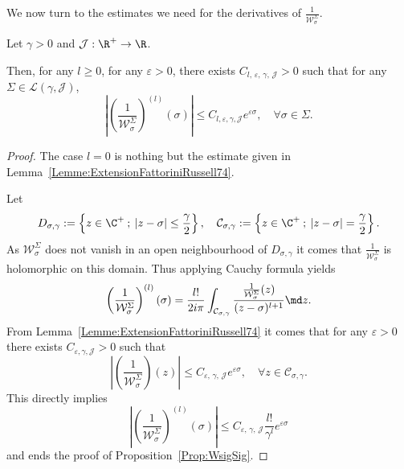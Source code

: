 We now turn to the estimates we need for the derivatives of $\frac{1}{\mathcal{W}^{\Sigma}_{\sigma}}$.

\begin{prop}\label{Prop:WsigSig}
Let $\gamma >0$ and $\mathcal{J} : \R^+ \to \R$.

Then, for any $l \geq 0$, for any $\varepsilon >0$, there exists $C_{l,\,\varepsilon,\,\gamma,\,\mathcal{J}}>0$ such that for any $\Sigma \in \mathcal{L}(\gamma, \mathcal{J})$,
\[
\left| \left(\frac{1}{\mathcal{W}^\Sigma_{\sigma}} \right)^{(l)} (\sigma) \right| \leq C_{l,\varepsilon, \gamma, \mathcal{J}} e^{\varepsilon \sigma}, \quad \forall \sigma \in \Sigma.
\]
\end{prop}

\begin{proof}
The case $l=0$ is nothing but the estimate given in Lemma~\ref{Lemme:ExtensionFattoriniRussell74}.

Let
\[
D_{\sigma,\gamma} := \left\{ z \in \C^+ \: ; \: |z-\sigma| \leq \frac{\gamma}{2} \right\},
\quad
\mathcal{C}_{\sigma,\gamma} := \left\{ z \in \C^+ \: ; \: |z-\sigma| = \frac{\gamma}{2} \right\}.
\]
As $\mathcal{W}^{\Sigma}_\sigma$ does not vanish in an open neighbourhood of $D_{\sigma, \gamma}$ it comes that $\frac{1}{\mathcal{W}^{\Sigma}_\sigma}$ is holomorphic on this domain. Thus applying Cauchy formula yields
\[
\left(\frac{1}{\mathcal{W}^\Sigma_\sigma} \right)^{(l)} (\sigma) = \frac{l!}{2i\pi} \int_{\mathcal{C}_{\sigma,\gamma}} \frac{\frac{1}{\mathcal{W}^\Sigma_\sigma}(z)}{(z-\sigma)^{l+1}} \md z.
\]
From Lemma~\ref{Lemme:ExtensionFattoriniRussell74} it comes that for any $\varepsilon>0$ there exists $C_{\varepsilon, \gamma, \mathcal{J}}>0$ such that
\[
\left| \left(\frac{1}{\mathcal{W}^\Sigma_\sigma} \right)(z) \right| \leq C_{\varepsilon,\,\gamma,\,\mathcal{J}} e^{\varepsilon \sigma}, \quad\forall z\in \mathcal{C}_{\sigma,\gamma}.
\]
This directly implies
\[
\left| \left(\frac{1}{\mathcal{W}^\Sigma_\sigma} \right)^{(l)}(\sigma) \right| \leq C_{\varepsilon,\,\gamma,\,\mathcal{J}} \frac{l!}{\gamma^l} e^{\varepsilon \sigma}
\]
and ends the proof of Proposition~\ref{Prop:WsigSig}.
\end{proof}



